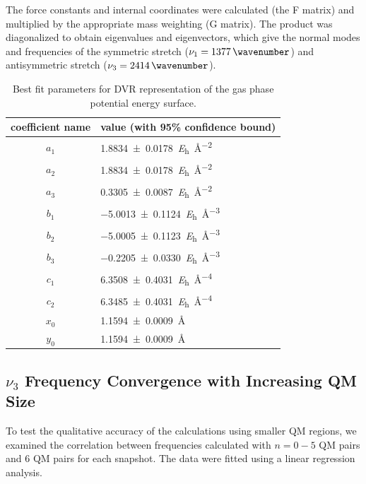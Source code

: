 The force constants and internal coordinates were calculated (the F matrix) and multiplied by the appropriate mass weighting (G matrix). The product was diagonalized to obtain eigenvalues and eigenvectors, which give the normal modes and frequencies of the symmetric stretch (\(\nu_{1} = \SI{1377}{\wavenumber}\)) and antisymmetric stretch (\(\nu_{3} = \SI{2414}{\wavenumber}\)).

\begin{table}
  \centering
  \caption[Fit parameters for DVR PES]{Best fit parameters for DVR representation of the gas phase  potential energy surface.}
  \label{paper_02:tab:S5}
  \begin{tabular}{cl}
    \toprule
    coefficient name & value (with 95\% confidence bound) \\
    \midrule
    \(a_1\) & \SI{1.8834 \pm 0.0178}{\hartree\per\angstrom\squared} \\
    \(a_2\) & \SI{1.8834 \pm 0.0178}{\hartree\per\angstrom\squared} \\
    \(a_3\) & \SI{0.3305 \pm 0.0087}{\hartree\per\angstrom\squared} \\
    \(b_1\) & \SI{-5.0013 \pm 0.1124}{\hartree\per\angstrom\cubed} \\
    \(b_2\) & \SI{-5.0005 \pm 0.1123}{\hartree\per\angstrom\cubed} \\
    \(b_3\) & \SI{-0.2205 \pm 0.0330}{\hartree\per\angstrom\cubed} \\
    \(c_1\) & \SI{6.3508 \pm 0.4031}{\hartree\per\angstrom\tothe{4}} \\
    \(c_2\) & \SI{6.3485 \pm 0.4031}{\hartree\per\angstrom\tothe{4}} \\
    \(x_0\) & \SI{1.1594 \pm 0.0009}{\angstrom} \\
    \(y_0\) & \SI{1.1594 \pm 0.0009}{\angstrom} \\
    \bottomrule
  \end{tabular}
\end{table}

\subsection{\texorpdfstring{\(\nu_{3}\)}{Asymmetric Stretch} Frequency Convergence with Increasing QM Size}
\label{paper_02:ssec:SI6}

To test the qualitative accuracy of the calculations using smaller QM regions, we examined the correlation between frequencies calculated with \(n = 0-5\) QM pairs and \num{6} QM pairs for each snapshot. The data were fitted using a linear regression analysis.

